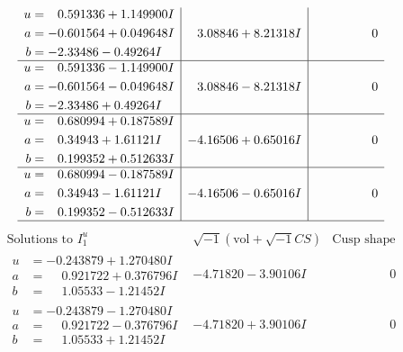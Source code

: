 \documentclass[1p]{elsarticle_modified}
\theoremstyle{definition}
\newcommand{\I}{\sqrt{-1}}
\begin{document}
$$\begin{array}{c|c|c}
\begin{aligned}
u &= \phantom{-}0.591336 + 1.149900 I \\
a &= -0.601564 + 0.049648 I \\
b &= -2.33486 - 0.49264 I\end{aligned}
 & \phantom{-}3.08846 + 8.21318 I & \phantom{-0.000000 } 0 \\ \hline\begin{aligned}
u &= \phantom{-}0.591336 - 1.149900 I \\
a &= -0.601564 - 0.049648 I \\
b &= -2.33486 + 0.49264 I\end{aligned}
 & \phantom{-}3.08846 - 8.21318 I & \phantom{-0.000000 } 0 \\ \hline\begin{aligned}
u &= \phantom{-}0.680994 + 0.187589 I \\
a &= \phantom{-}0.34943 + 1.61121 I \\
b &= \phantom{-}0.199352 + 0.512633 I\end{aligned}
 & -4.16506 + 0.65016 I & \phantom{-0.000000 } 0 \\ \hline\begin{aligned}
u &= \phantom{-}0.680994 - 0.187589 I \\
a &= \phantom{-}0.34943 - 1.61121 I \\
b &= \phantom{-}0.199352 - 0.512633 I\end{aligned}
 & -4.16506 - 0.65016 I & \phantom{-0.000000 } 0\\
 \hline 
 \end{array}$$\newpage$$\begin{array}{c|c|c}  
\text{Solutions to }I^u_{1}& \I (\text{vol} + \sqrt{-1}CS) & \text{Cusp shape}\\
 \hline 
\begin{aligned}
u &= -0.243879 + 1.270480 I \\
a &= \phantom{-}0.921722 + 0.376796 I \\
b &= \phantom{-}1.05533 - 1.21452 I\end{aligned}
 & -4.71820 - 3.90106 I & \phantom{-0.000000 } 0 \\ \hline\begin{aligned}
u &= -0.243879 - 1.270480 I \\
a &= \phantom{-}0.921722 - 0.376796 I \\
b &= \phantom{-}1.05533 + 1.21452 I\end{aligned}
 & -4.71820 + 3.90106 I & \phantom{-0.000000 } 0 \\ \hline\begin{aligned}

\end{aligned}
\end{array}$$
\end{document}
